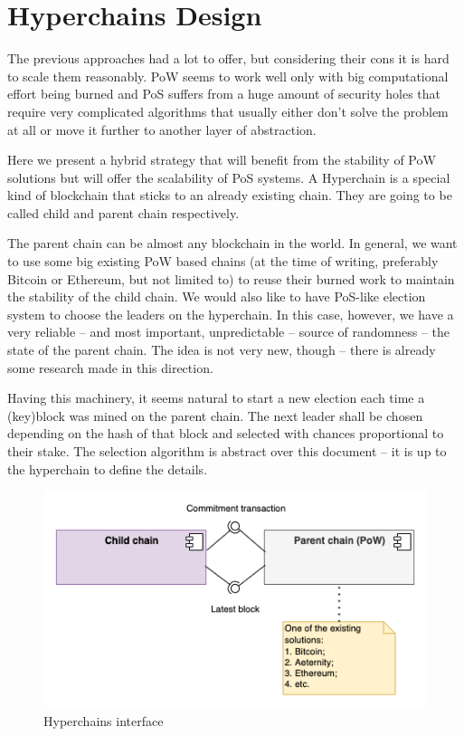 \section{Hyperchains Design}
\graphicspath{ {./images/} }

The previous approaches had a lot to offer, but considering their cons it is hard
to scale them reasonably. PoW seems to work well only with big
computational effort being burned and PoS suffers from a huge amount of security
holes that require very complicated algorithms that usually either don't solve
the problem at all or move it further to another layer of abstraction.

Here we present a hybrid strategy that will benefit from the stability of PoW
solutions but will offer the scalability of PoS systems. A Hyperchain is a
special kind of blockchain that sticks to an already existing chain. They are
going to be called child and parent chain respectively\cite{hyperchains}.

The parent chain can be almost any blockchain in the world. In general, we want
to use some big existing PoW based chains (at the time of writing, preferably
Bitcoin or Ethereum, but not limited to) to reuse their burned work to maintain
the stability of the child chain. We would also like to have
PoS-like election system to choose the leaders on the hyperchain. In this case,
however, we have a very reliable – and most important, unpredictable – source
of randomness – the state of the parent chain. The idea is not very new,
though – there is already some research made in this direction\cite{blockchain_random}.

Having this machinery, it seems natural to start a new election each time a
(key)block was mined on the parent chain. The next leader shall be chosen
depending on the hash of that block and selected with chances proportional to
their stake. The selection algorithm is abstract over this document – it is
up to the hyperchain to define the details.

\begin{figure}[b]
     \caption{Hyperchains interface}
     \centering
     \includegraphics[scale=0.5]{hyperchains_interface}
\end{figure}

